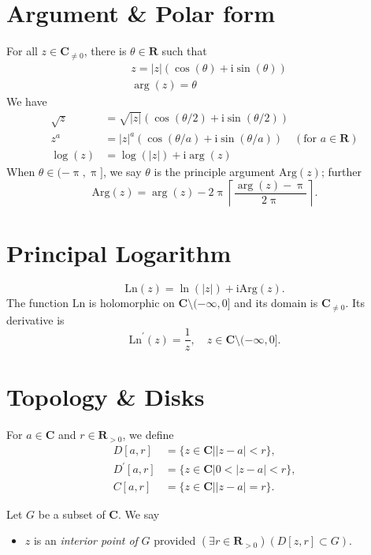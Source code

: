 \documentclass[letterpaper,landscape,9pt,fleqn]{extarticle}
\newcommand{\reals}{\mathbf{R}}
\newcommand{\complex}{\mathbf{C}}
\newcommand{\im}{\mathrm{i}}
\newcommand{\Arg}{\mathrm{Arg}}
\newcommand{\Ln}{\mathrm{Ln}}
\begin{document}
\begin{multicols*}{3}
\section*{Argument \& Polar form}
For all \(z \in \complex_{\neq 0}\), there is 
\(\theta \in \reals\) such that
\begin{alignat*}{1}
   &z = |z| (\cos(\theta) + \im \sin(\theta)) \\
   &\arg(z) = \theta
\end{alignat*}
We have
\begin{alignat*}{1}
  \sqrt{z} &= \sqrt{|z|} (\cos(\theta/2) + \im \sin(\theta/2)) \\
  z^a &= |z|^a  (\cos(\theta/a) + \im \sin(\theta/a))  \quad (\mbox{for } a \in \reals) \\
  \log(z) &= \log(|z|) + \im \arg(z)
\end{alignat*}
When \(\theta \in (-\uppi, \uppi]\), we say $\theta$ is the 
principle argument \(\Arg(z) \); further
\begin{equation*}
  \Arg(z) = \arg(z) - 2 \uppi \left \lceil 
     \frac{\arg(z) - \uppi}{2 \uppi} \right \rceil.
\end{equation*}

\section*{Principal Logarithm}
\begin{equation*}
\Ln(z) = \ln(|z|) + \im \Arg(z).
\end{equation*}
The function $\Ln$ is holomorphic on $\complex \setminus (-\infty,0]$
and its domain is $\complex_{\neq 0}$. Its derivative is
\begin{equation*}
  \Ln^\prime(z) = \frac{1}{z}, \quad z \in \complex \setminus (-\infty,0].
\end{equation*}

 
\section*{Topology \& Disks}
For $a \in \complex$ and $r \in \reals_{>0}$, we define
\begin{align*}
  D[a,r] &= \{z \in \complex | |z-a| < r \}, \\
  D^\prime[a,r] &= \{z \in \complex | 0 < |z-a| < r \}, \\
  C[a,r] &= \{z \in \complex | |z-a| = r \}.
\end{align*}

Let $G$ be a subset of $\complex$. We say 
\begin{itemize}
  \item $z$ is an \emph{interior point of} $G$ provided
  \((\exists r \in \reals_{>0})(D[z,r] \subset G) \).


\end{itemize}
\end{multicols*}
\end{document}
